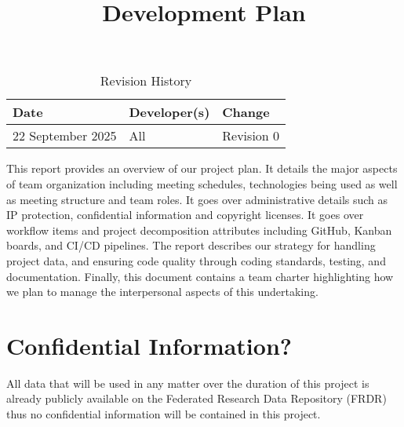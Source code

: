 \documentclass{article}
\title{Development Plan\\\progname}
\author{\authname}
\date{}
\begin{document}
\maketitle

\begin{table}[hp]
\caption{Revision History} \label{TblRevisionHistory}
\begin{tabularx}{\textwidth}{llX}
\toprule
\textbf{Date} & \textbf{Developer(s)} & \textbf{Change}\\
\midrule
22 September 2025 & All & Revision 0\\
\bottomrule
\end{tabularx}
\end{table}

\newpage{}



\par{This report provides an overview of our project plan. It details the major aspects of team organization including meeting schedules,
technologies being used as well as meeting structure and team roles. It goes over administrative details such as IP protection, confidential information
and copyright licenses. It goes over workflow items and project decomposition
attributes including GitHub, Kanban boards, and CI/CD pipelines. The report describes our strategy for handling project data, 
and ensuring code quality through coding standards, testing, and documentation. Finally, this document contains a team charter highlighting
how we plan to manage the interpersonal aspects of this undertaking.}

\section{Confidential Information?}


\par{All data that will be used in any matter over the duration of this project is already publicly available on the Federated Research Data Repository (FRDR)
thus no confidential information will be contained in this project.}
\end{document}
